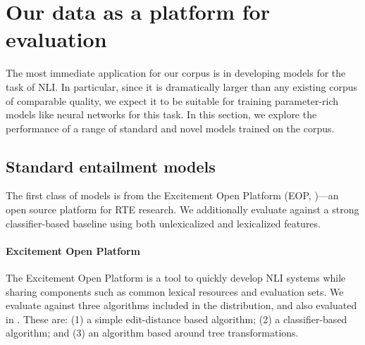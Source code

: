 \section{Our data as a platform for evaluation}

The most immediate application for our corpus is in developing models for the task of NLI. In particular, since it is dramatically larger than any existing corpus of comparable quality, we expect it to be suitable for training  parameter-rich models like neural networks for this task. In this section, we explore the performance of a range of standard and novel models trained on the corpus.

\subsection{Standard entailment models}

The first class of models is from the Excitement Open
  Platform (EOP,
  \citealt{pado2014design,magnini2014excitement})---an open source platform for RTE research.
We additionally evaluate against a strong classifier-based baseline using
  both unlexicalized and lexicalized features.

%
%
\paragraph{Excitement Open Platform}
The Excitement Open Platform is a tool to quickly develop NLI systems
  while sharing components such as common lexical resources and 
  evaluation sets.
We evaluate against three algorithms included in the distribution,
  and also evaluated in .
These are: 
  (1) a simple edit-distance based algorithm;
  (2) a classifier-based algorithm; and
  (3) an algorithm based around tree transformations.


